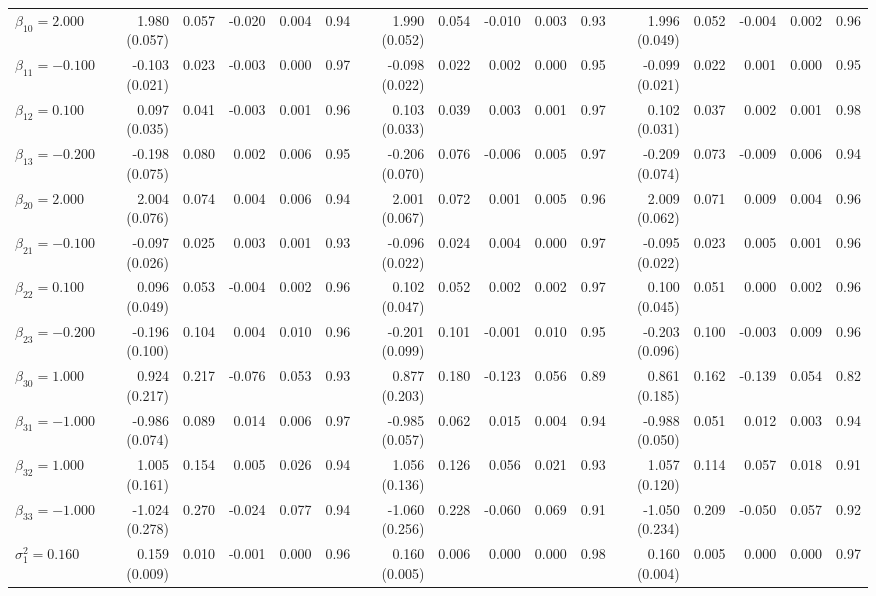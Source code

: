 \begin{landscape}
\begin{table}[ht]
\begin{tabular}{l|rrrrr:rrrrr:rrrrr}
  $\beta_{10}= 2.000$ &  1.980 (0.057) & 0.057 & -0.020 & 0.004 & 0.94 &  1.990 (0.052) & 0.054 & -0.010 & 0.003 & 0.93 &  1.996 (0.049) & 0.052 & -0.004 & 0.002 & 0.96 \\ 
  $\beta_{11}=-0.100$ & -0.103 (0.021) & 0.023 & -0.003 & 0.000 & 0.97 & -0.098 (0.022) & 0.022 &  0.002 & 0.000 & 0.95 & -0.099 (0.021) & 0.022 &  0.001 & 0.000 & 0.95 \\ 
  $\beta_{12}= 0.100$ &  0.097 (0.035) & 0.041 & -0.003 & 0.001 & 0.96 &  0.103 (0.033) & 0.039 &  0.003 & 0.001 & 0.97 &  0.102 (0.031) & 0.037 &  0.002 & 0.001 & 0.98 \\ 
  $\beta_{13}=-0.200$ & -0.198 (0.075) & 0.080 &  0.002 & 0.006 & 0.95 & -0.206 (0.070) & 0.076 & -0.006 & 0.005 & 0.97 & -0.209 (0.074) & 0.073 & -0.009 & 0.006 & 0.94 \\ 
  $\beta_{20}= 2.000$ &  2.004 (0.076) & 0.074 &  0.004 & 0.006 & 0.94 &  2.001 (0.067) & 0.072 &  0.001 & 0.005 & 0.96 &  2.009 (0.062) & 0.071 &  0.009 & 0.004 & 0.96 \\ 
  $\beta_{21}=-0.100$ & -0.097 (0.026) & 0.025 &  0.003 & 0.001 & 0.93 & -0.096 (0.022) & 0.024 &  0.004 & 0.000 & 0.97 & -0.095 (0.022) & 0.023 &  0.005 & 0.001 & 0.96 \\ 
  $\beta_{22}= 0.100$ &  0.096 (0.049) & 0.053 & -0.004 & 0.002 & 0.96 &  0.102 (0.047) & 0.052 &  0.002 & 0.002 & 0.97 &  0.100 (0.045) & 0.051 &  0.000 & 0.002 & 0.96 \\ 
  $\beta_{23}=-0.200$ & -0.196 (0.100) & 0.104 &  0.004 & 0.010 & 0.96 & -0.201 (0.099) & 0.101 & -0.001 & 0.010 & 0.95 & -0.203 (0.096) & 0.100 & -0.003 & 0.009 & 0.96 \\ 
  $\beta_{30}= 1.000$ &  0.924 (0.217) & 0.217 & -0.076 & 0.053 & 0.93 &  0.877 (0.203) & 0.180 & -0.123 & 0.056 & 0.89 &  0.861 (0.185) & 0.162 & -0.139 & 0.054 & 0.82 \\ 
  $\beta_{31}=-1.000$ & -0.986 (0.074) & 0.089 &  0.014 & 0.006 & 0.97 & -0.985 (0.057) & 0.062 &  0.015 & 0.004 & 0.94 & -0.988 (0.050) & 0.051 &  0.012 & 0.003 & 0.94 \\ 
  $\beta_{32}= 1.000$ &  1.005 (0.161) & 0.154 &  0.005 & 0.026 & 0.94 &  1.056 (0.136) & 0.126 &  0.056 & 0.021 & 0.93 &  1.057 (0.120) & 0.114 &  0.057 & 0.018 & 0.91 \\ 
  $\beta_{33}=-1.000$ & -1.024 (0.278) & 0.270 & -0.024 & 0.077 & 0.94 & -1.060 (0.256) & 0.228 & -0.060 & 0.069 & 0.91 & -1.050 (0.234) & 0.209 & -0.050 & 0.057 & 0.92 \\ 
  $\sigma^2_1= 0.160$ &  0.159 (0.009) & 0.010 & -0.001 & 0.000 & 0.96 &  0.160 (0.005) & 0.006 &  0.000 & 0.000 & 0.98 &  0.160 (0.004) & 0.005 &  0.000 & 0.000 & 0.97 \\ 

\end{tabular}
\end{table}
\end{landscape}
